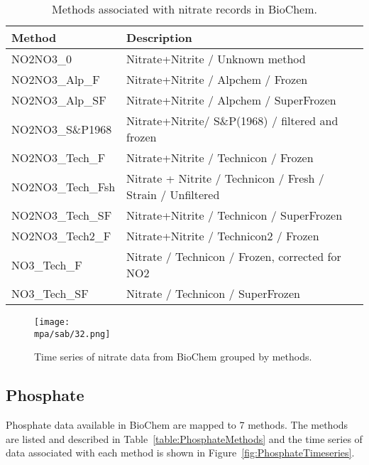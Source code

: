 \documentclass[letterpaper,portrait,11pt]{scrartcl}
\numberwithin{equation}{section}		%
\numberwithin{figure}{section}		%
\numberwithin{table}{section}				%
\newcommand*{\D}{.}
\newcommand{\biodata}{\string~/bio\D data}   %
\newcommand{\mpa}{\biodata/bio\D indicators/mpa}  %
\begin{document}
\begin{appendices}
\begin{table}[h]
  \caption{Methods associated with nitrate records in BioChem.}
    \label{table:Nmethods}
  \begin{tabular}{ll}
    Method & Description\\
    \hline
    NO2NO3\_0 & Nitrate+Nitrite / Unknown method \\
    NO2NO3\_Alp\_F & Nitrate+Nitrite / Alpchem / Frozen \\
    NO2NO3\_Alp\_SF & Nitrate+Nitrite / Alpchem / SuperFrozen \\
    NO2NO3\_S\&P1968 & Nitrate+Nitrite/ S\&P(1968) / filtered and frozen \\
    NO2NO3\_Tech\_F & Nitrate+Nitrite / Technicon / Frozen \\
    NO2NO3\_Tech\_Fsh & Nitrate + Nitrite / Technicon / Fresh / Strain / Unfiltered \\
    NO2NO3\_Tech\_SF & Nitrate+Nitrite / Technicon / SuperFrozen \\
    NO2NO3\_Tech2\_F & Nitrate+Nitrite / Technicon2 / Frozen \\
    NO3\_Tech\_F & Nitrate / Technicon / Frozen, corrected for NO2 \\
    NO3\_Tech\_SF & Nitrate / Technicon / SuperFrozen\\
  \end{tabular}
\end{table}

\begin{figure}[h]

  \centering
  \texttt{[image: \\mpa/sab/32.png]}
  \caption{Time series of nitrate data from BioChem grouped by methods.}
    \label{fig:NTimeseries}
\end{figure}

\subsection{Phosphate}

Phosphate  data available in BioChem are mapped to 7 methods. The methods are listed and described in Table~\ref{table:PhosphateMethods} and the time series of data associated with each method is shown in Figure~\ref{fig:PhosphateTimeseries}.


\end{appendices}
\end{document}
